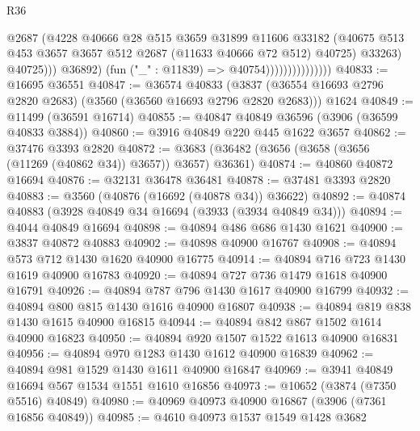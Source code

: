 \begin{lexlean}{R36}
\begin{coremodule}
                                        @2687
                                        (@4228
                                          @40666
                                          @28
                                          @515
                                          @3659
                                          @31899
                                          @11606
                                          @33182
                                          (@40675
                                            @513
                                            @453
                                            @3657
                                            @3657
                                            @512
                                            @2687
                                            (@11633 @40666 @72 @512)
                                            @40725)
                                          @33263)
                                        @40725)))
                                  @36892)
                                (fun ("_" : @11839) => @40754)))))))))))))))
@40833 := @16695 @36551
@40847 := @36574
    @40833
    (@3837 (@36554 @16693 @2796 @2820 @2683) (@3560 (@36560 @16693 @2796 @2820 @2683)))
    @1624
@40849 := @11499 (@36591 @16714)
@40855 := @40847 @40849 @36596 (@3906 (@36599 @40833 @3884))
@40860 := @3916 @40849 @220 @445 @1622 @3657
@40862 := @37476 @3393 @2820
@40872 := @3683 (@36482 (@3656 (@3658 (@3656 (@11269 (@40862 @34)) @3657)) @3657) @36361)
@40874 := @40860 @40872 @16694
@40876 := @32131 @36478 @36481
@40878 := @37481 @3393 @2820
@40883 := @3560 (@40876 (@16692 (@40878 @34)) @36622)
@40892 := @40874 @40883 (@3928 @40849 @34 @16694 (@3933 (@3934 @40849 @34)))
@40894 := @4044 @40849 @16694
@40898 := @40894 @486 @686 @1430 @1621
@40900 := @3837 @40872 @40883
@40902 := @40898 @40900 @16767
@40908 := @40894 @573 @712 @1430 @1620 @40900 @16775
@40914 := @40894 @716 @723 @1430 @1619 @40900 @16783
@40920 := @40894 @727 @736 @1479 @1618 @40900 @16791
@40926 := @40894 @787 @796 @1430 @1617 @40900 @16799
@40932 := @40894 @800 @815 @1430 @1616 @40900 @16807
@40938 := @40894 @819 @838 @1430 @1615 @40900 @16815
@40944 := @40894 @842 @867 @1502 @1614 @40900 @16823
@40950 := @40894 @920 @1507 @1522 @1613 @40900 @16831
@40956 := @40894 @970 @1283 @1430 @1612 @40900 @16839
@40962 := @40894 @981 @1529 @1430 @1611 @40900 @16847
@40969 := @3941 @40849 @16694 @567 @1534 @1551 @1610 @16856
@40973 := @10652 (@3874 (@7350 @5516) @40849)
@40980 := @40969 @40973 @40900 @16867 (@3906 (@7361 @16856 @40849))
@40985 := @4610 @40973 @1537 @1549 @1428 @3682

\end{coremodule}
\end{lexlean}
